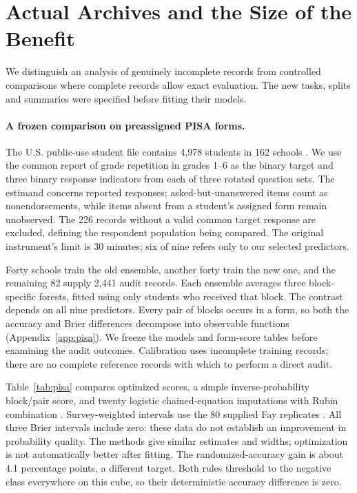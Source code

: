 \section{Actual Archives and the Size of the Benefit}\label{sec:exp}
We distinguish an analysis of genuinely incomplete records from controlled
comparisons where complete records allow exact evaluation. The new tasks,
splits and summaries were specified before fitting their models.

\paragraph{A frozen comparison on preassigned PISA forms.}
The U.S. public-use student file contains 4,978 students in 162 schools
\citep{pisaus2014}. We use the common report of grade repetition in grades
1--6 as the binary target and three binary response indicators from each
of three rotated question sets. The estimand concerns reported responses;
asked-but-unanswered items count as nonendorsements, while items absent
from a student's assigned form remain unobserved. The 226 records without
a valid common target response are excluded, defining the respondent
population being compared. The original instrument's limit is 30 minutes;
six of nine refers only to our selected predictors.

Forty schools train the old ensemble, another forty train the new one, and
the remaining 82 supply 2,441 audit records. Each ensemble averages three
block-specific forests, fitted using only students who received that
block. The contrast depends on all nine predictors. Every pair of blocks
occurs in a form, so both the accuracy and Brier differences decompose
into observable functions (Appendix~\ref{app:pisa}). We freeze the models
and form-score tables before examining the audit outcomes. Calibration
uses incomplete training records; there are no complete reference records
with which to perform a direct audit.



Table~\ref{tab:pisa} compares optimized scores, a simple inverse-probability
block/pair score, and twenty logistic chained-equation imputations with
Rubin combination \citep{vanbuuren2011}. Survey-weighted intervals use the
80 supplied Fay replicates \citep{kastberg2014}. All three Brier intervals
include zero: these data do not establish an improvement in probability
quality. The methods give similar estimates and widths; optimization is
not automatically better after fitting. The randomized-accuracy gain is
about 4.1 percentage points, a different target. Both rules threshold to
the negative class everywhere on this cube, so their deterministic
accuracy difference is zero.


